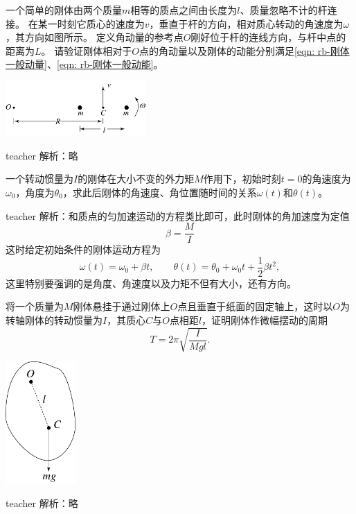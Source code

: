 \begin{example}
一个简单的刚体由两个质量$m$相等的质点之间由长度为$l$、质量忽略不计的杆连接。
在某一时刻它质心的速度为$v$，垂直于杆的方向，相对质心转动的角速度为$\omega$，其方向如图所示。
定义角动量的参考点$O$刚好位于杆的连线方向，与杆中点的距离为$L$。
请验证刚体相对于$O$点的角动量以及刚体的动能分别满足\ref{eqn: rb-刚体一般动量}、\ref{eqn: rb-刚体一般动能}。
\begin{flushright}
\includegraphics[width=0.4\textwidth]{images/rb-problem-5.pdf}
\end{flushright}
\begin{taggedblock}{teacher}
\noindent
解析：略
\end{taggedblock}
\end{example}

\begin{example}
一个转动惯量为$I$的刚体在大小不变的外力矩$M$作用下，初始时刻$t=0$的角速度为$\omega_0$，角度为$\theta_0$，求此后刚体的角速度、角位置随时间的关系$\omega(t)$和$\theta(t)$。
\begin{taggedblock}{teacher}
\newline
解析：和质点的匀加速运动的方程类比即可，此时刚体的角加速度为定值
\[\beta = \frac{M}{I}\]
这时给定初始条件的刚体运动方程为
\[\omega(t) = \omega_0+\beta t,\qquad \theta(t) = \theta_0+\omega_0 t+\frac{1}{2}\beta t^2,\]
这里特别要强调的是角度、角速度以及力矩不但有大小，还有方向。
\end{taggedblock}
\end{example}

\begin{example}
将一个质量为$M$刚体悬挂于通过刚体上$O$点且垂直于纸面的固定轴上，这时以$O$为转轴刚体的转动惯量为$I$，其质心$C$与$O$点相距$l$，证明刚体作微幅摆动的周期
\[T = 2\pi\sqrt{\frac{I}{Mgl}}.\]
\begin{flushright}
\includegraphics[width=0.2\textwidth]{images/rb-problem-7.pdf}
\end{flushright}
\begin{taggedblock}{teacher}
\noindent
解析：略
\end{taggedblock}
\end{example}


